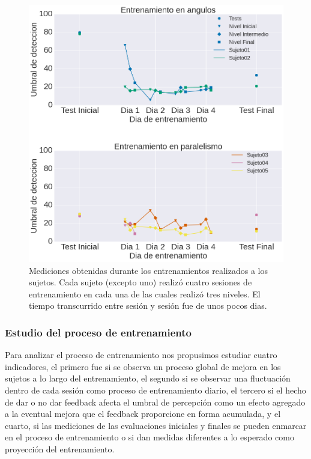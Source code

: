 \documentclass{article}
\begin{document}
    
    \begin{figure}
        \center
        \includegraphics[width=\textwidth]{Imagenes/TransferenciaEntrenamientoNuevo.png}
        \caption{Mediciones obtenidas durante los entrenamientos realizados a los sujetos. Cada sujeto (excepto uno) realizó cuatro sesiones de entrenamiento en cada una de las cuales realizó tres niveles. El tiempo transcurrido entre sesión y sesión fue de unos pocos dias.}
        \label{fig:Exp2_Entrenamiento}
    \end{figure}  


    \subsubsection{Estudio del proceso de entrenamiento} \label{seccion:Exp2}
    
    Para analizar el proceso de entrenamiento nos propusimos estudiar cuatro indicadores, el primero fue si se observa un proceso global de mejora en los sujetos a lo largo del entrenamiento, el segundo si se observar una fluctuación dentro de cada sesión como proceso de entrenamiento diario, el tercero si el hecho de dar o no dar feedback afecta el umbral de percepción como un efecto agregado a la eventual mejora que el feedback proporcione en forma acumulada, y el cuarto, si las mediciones de las evaluaciones iniciales y finales se pueden enmarcar en el proceso de entrenamiento o si dan medidas diferentes a lo esperado como proyección del entrenamiento. 
    
\end{document}
